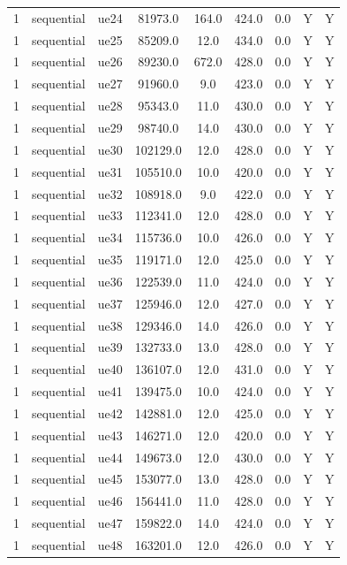 \begin{table}[ht]
\begin{tabular}{|c|c|c|c|c|c|c|c|c|}
1 & sequential & ue24 & 81973.0 & 164.0 & 424.0 & 0.0 & Y & Y \\
1 & sequential & ue25 & 85209.0 & 12.0 & 434.0 & 0.0 & Y & Y \\
1 & sequential & ue26 & 89230.0 & 672.0 & 428.0 & 0.0 & Y & Y \\
1 & sequential & ue27 & 91960.0 & 9.0 & 423.0 & 0.0 & Y & Y \\
1 & sequential & ue28 & 95343.0 & 11.0 & 430.0 & 0.0 & Y & Y \\
1 & sequential & ue29 & 98740.0 & 14.0 & 430.0 & 0.0 & Y & Y \\
1 & sequential & ue30 & 102129.0 & 12.0 & 428.0 & 0.0 & Y & Y \\
1 & sequential & ue31 & 105510.0 & 10.0 & 420.0 & 0.0 & Y & Y \\
1 & sequential & ue32 & 108918.0 & 9.0 & 422.0 & 0.0 & Y & Y \\
1 & sequential & ue33 & 112341.0 & 12.0 & 428.0 & 0.0 & Y & Y \\
1 & sequential & ue34 & 115736.0 & 10.0 & 426.0 & 0.0 & Y & Y \\
1 & sequential & ue35 & 119171.0 & 12.0 & 425.0 & 0.0 & Y & Y \\
1 & sequential & ue36 & 122539.0 & 11.0 & 424.0 & 0.0 & Y & Y \\
1 & sequential & ue37 & 125946.0 & 12.0 & 427.0 & 0.0 & Y & Y \\
1 & sequential & ue38 & 129346.0 & 14.0 & 426.0 & 0.0 & Y & Y \\
1 & sequential & ue39 & 132733.0 & 13.0 & 428.0 & 0.0 & Y & Y \\
1 & sequential & ue40 & 136107.0 & 12.0 & 431.0 & 0.0 & Y & Y \\
1 & sequential & ue41 & 139475.0 & 10.0 & 424.0 & 0.0 & Y & Y \\
1 & sequential & ue42 & 142881.0 & 12.0 & 425.0 & 0.0 & Y & Y \\
1 & sequential & ue43 & 146271.0 & 12.0 & 420.0 & 0.0 & Y & Y \\
1 & sequential & ue44 & 149673.0 & 12.0 & 430.0 & 0.0 & Y & Y \\
1 & sequential & ue45 & 153077.0 & 13.0 & 428.0 & 0.0 & Y & Y \\
1 & sequential & ue46 & 156441.0 & 11.0 & 428.0 & 0.0 & Y & Y \\
1 & sequential & ue47 & 159822.0 & 14.0 & 424.0 & 0.0 & Y & Y \\
1 & sequential & ue48 & 163201.0 & 12.0 & 426.0 & 0.0 & Y & Y \\

\end{tabular}
\end{table}
